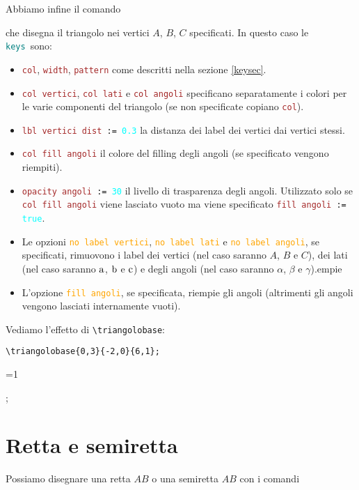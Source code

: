 \documentclass[italian, a4paper]{article}
\def\showimmagini{1} %
\newcommand{\bs}{\textbackslash}
\newcommand{\ttt}[1]{\texttt{#1}}
\newcommand{\comandons}[2][\large]{\vspace*{1mm}\noindent\fbox{\parbox{\textwidth}{#1\ttt{#2}}}}
\newcommand{\comando}[2][\large]{\comandons[#1]{#2}\vspace*{3mm}}
\newcommand{\blue}[1]{\textcolor{blue}{#1}}
\newcommand{\cyan}[1]{\textcolor{cyan}{#1}}
\newcommand{\keys}{\textcolor{teal}{\ttt{keys}}}
\newcommand{\key}[1]{\textcolor{brown}{\ttt{#1}}}
\newcommand{\keyop}[1]{\textcolor{orange}{\ttt{#1}}}
\newcommand{\keyval}[1]{\cyan{\ttt{#1}}}
\begin{document}
Abbiamo infine il comando

\comando{\bs triangolobase[\keys]\{\blue{A}\}\{\blue{B}\}\{\blue{C}\};}
che disegna il triangolo nei vertici $A$, $B$, $C$ specificati. In questo caso le \keys\ sono:
\begin{itemize}[nolistsep]
\item \key{col}, \key{width}, \key{pattern} come descritti nella sezione \ref{keysec}.
\item \key{col vertici}, \key{col lati} e \key{col angoli} specificano separatamente i colori per le varie componenti del triangolo (se non specificate copiano \key{col}).
\item \ttt{\key{lbl vertici dist} := \keyval{0.3}} la distanza dei label dei vertici dai vertici stessi.
\item \key{col fill angoli} il colore del filling degli angoli (se specificato vengono riempiti).
\item \ttt{\key{opacity angoli} := \keyval{30}} il livello di trasparenza degli angoli. Utilizzato solo se \key{col fill angoli} viene lasciato vuoto ma viene specificato \ttt{\key{fill angoli} := \keyval{true}}.
\item Le opzioni \keyop{no label vertici}, \keyop{no label lati} e \keyop{no label angoli}, se specificati, rimuovono i label dei vertici (nel caso saranno $A$, $B$ e $C$), dei lati (nel caso saranno $\mathrm{a}$, $\mathrm{b}$ e $\mathrm{c}$) e degli angoli (nel caso saranno $\alpha$, $\beta$ e $\gamma$).empie \item L'opzione \keyop{fill angoli}, se specificata, riempie gli angoli (altrimenti gli angoli vengono lasciati internamente vuoti).
\end{itemize}

Vediamo l'effetto di \ttt{\bs triangolobase}:

\begin{Verbatim}[frame=single]
\triangolobase{0,3}{-2,0}{6,1};
\end{Verbatim}
\vspace*{-4mm}

\ifnum\showimmagini=1
\begin{immagine}
;
\end{immagine}
\fi

\newpage\section{Retta e semiretta}
Possiamo disegnare una retta $AB$ o una semiretta $AB$ con i comandi
\end{document}
